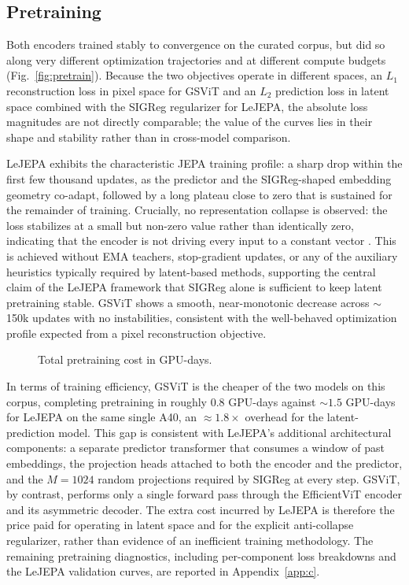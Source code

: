 \documentclass[11pt, a4paper]{article}
\begin{document}
\subsection{Pretraining}
Both encoders trained stably to convergence on the curated corpus, but did so along very different optimization trajectories and at different compute budgets
(Fig.~\ref{fig:pretrain}). Because the two objectives operate in
different spaces, an $L_1$ reconstruction loss in pixel space for
GSViT and an $L_2$ prediction loss in latent space combined with the
SIGReg regularizer for LeJEPA, the absolute loss magnitudes are not
directly comparable; the value of the curves lies in their shape and
stability rather than in cross-model comparison.

LeJEPA exhibits the characteristic JEPA training profile: a sharp
drop within the first few thousand updates, as the predictor and the
SIGReg-shaped embedding geometry co-adapt, followed by a long plateau
close to zero that is sustained for the remainder of training.
Crucially, no representation collapse is observed: the loss
stabilizes at a small but non-zero value rather than identically
zero, indicating that the encoder is not driving every input to a
constant vector \parencite{balestriero-2025}. This is achieved
without EMA teachers, stop-gradient updates, or any of the auxiliary
heuristics typically required by latent-based methods, supporting the
central claim of the LeJEPA framework that SIGReg alone is sufficient
to keep latent pretraining stable. GSViT shows a smooth,
near-monotonic decrease across $\sim$150k updates with no
instabilities, consistent with the well-behaved optimization profile
expected from a pixel reconstruction objective.
\newpage
\begin{figure}
\centering

\caption{Total pretraining cost in GPU-days.}
\label{fig:training_costs}
\vspace{-0.5em}
\end{figure}
In terms of training efficiency, GSViT is the cheaper of the two
models on this corpus, completing pretraining in roughly $0.8$
GPU-days against $\sim$$1.5$ GPU-days for LeJEPA on the same single
A40, an $\approx$$1.8\times$ overhead for the latent-prediction
model. This gap is consistent with LeJEPA's additional architectural
components: a separate predictor transformer that consumes a window
of past embeddings, the projection heads attached to both the encoder
and the predictor, and the $M = 1024$ random projections required by
SIGReg at every step. GSViT, by contrast, performs only a single
forward pass through the EfficientViT encoder and its asymmetric
decoder. The extra cost incurred by LeJEPA is therefore the price
paid for operating in latent space and for the explicit anti-collapse
regularizer, rather than evidence of an inefficient training methodology.
The remaining pretraining diagnostics, including per-component loss
breakdowns and the LeJEPA validation curves, are reported in
Appendix~\ref{app:c}.
\end{document}
